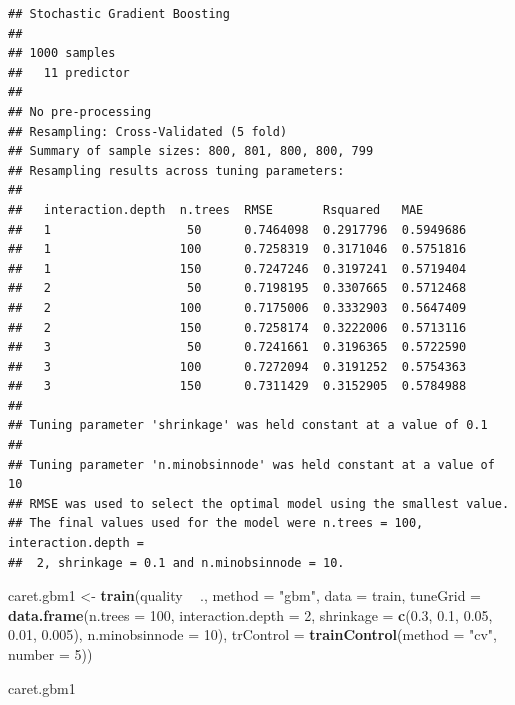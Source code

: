 \documentclass[
]{book}
\newenvironment{Shaded}{\begin{snugshade}}{\end{snugshade}}
\newcommand{\DataTypeTok}[1]{\textcolor[rgb]{0.13,0.29,0.53}{#1}}
\newcommand{\DecValTok}[1]{\textcolor[rgb]{0.00,0.00,0.81}{#1}}
\newcommand{\FloatTok}[1]{\textcolor[rgb]{0.00,0.00,0.81}{#1}}
\newcommand{\KeywordTok}[1]{\textcolor[rgb]{0.13,0.29,0.53}{\textbf{#1}}}
\newcommand{\NormalTok}[1]{#1}
\newcommand{\OperatorTok}[1]{\textcolor[rgb]{0.81,0.36,0.00}{\textbf{#1}}}
\newcommand{\StringTok}[1]{\textcolor[rgb]{0.31,0.60,0.02}{#1}}
\theoremstyle{break}
\theoremstyle{definition}
\theoremstyle{definition}
\theoremstyle{definition}
\theoremstyle{remark}
\begin{document}
\begin{verbatim}
## Stochastic Gradient Boosting 
## 
## 1000 samples
##   11 predictor
## 
## No pre-processing
## Resampling: Cross-Validated (5 fold) 
## Summary of sample sizes: 800, 801, 800, 800, 799 
## Resampling results across tuning parameters:
## 
##   interaction.depth  n.trees  RMSE       Rsquared   MAE      
##   1                   50      0.7464098  0.2917796  0.5949686
##   1                  100      0.7258319  0.3171046  0.5751816
##   1                  150      0.7247246  0.3197241  0.5719404
##   2                   50      0.7198195  0.3307665  0.5712468
##   2                  100      0.7175006  0.3332903  0.5647409
##   2                  150      0.7258174  0.3222006  0.5713116
##   3                   50      0.7241661  0.3196365  0.5722590
##   3                  100      0.7272094  0.3191252  0.5754363
##   3                  150      0.7311429  0.3152905  0.5784988
## 
## Tuning parameter 'shrinkage' was held constant at a value of 0.1
## 
## Tuning parameter 'n.minobsinnode' was held constant at a value of 10
## RMSE was used to select the optimal model using the smallest value.
## The final values used for the model were n.trees = 100, interaction.depth =
##  2, shrinkage = 0.1 and n.minobsinnode = 10.
\end{verbatim}

\begin{Shaded}
\begin{Highlighting}[]
\NormalTok{caret.gbm1 <-}\StringTok{ }\KeywordTok{train}\NormalTok{(quality }\OperatorTok{~}\StringTok{ }\NormalTok{., }\DataTypeTok{method =} \StringTok{"gbm"}\NormalTok{, }\DataTypeTok{data =}\NormalTok{ train,}
   \DataTypeTok{tuneGrid =} \KeywordTok{data.frame}\NormalTok{(}\DataTypeTok{n.trees =}  \DecValTok{100}\NormalTok{, }\DataTypeTok{interaction.depth =} \DecValTok{2}\NormalTok{, }
                        \DataTypeTok{shrinkage =} \KeywordTok{c}\NormalTok{(}\FloatTok{0.3}\NormalTok{, }\FloatTok{0.1}\NormalTok{, }\FloatTok{0.05}\NormalTok{, }\FloatTok{0.01}\NormalTok{, }\FloatTok{0.005}\NormalTok{),}
                        \DataTypeTok{n.minobsinnode =} \DecValTok{10}\NormalTok{),}
   \DataTypeTok{trControl =} \KeywordTok{trainControl}\NormalTok{(}\DataTypeTok{method =} \StringTok{"cv"}\NormalTok{, }\DataTypeTok{number =} \DecValTok{5}\NormalTok{))}
\end{Highlighting}
\end{Shaded}

\begin{Shaded}
\begin{Highlighting}[]
\NormalTok{caret.gbm1}
\end{Highlighting}
\end{Shaded}
\end{document}
